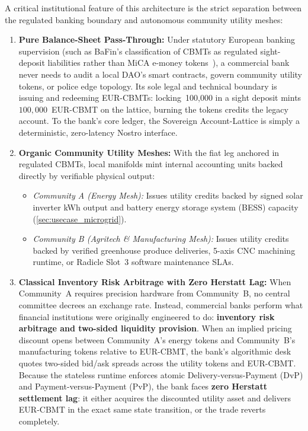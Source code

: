 \documentclass[a4paper,11pt,twoside,parskip=half-,headings=small]{scrartcl}
\newcommand{\EUR}[1]{\texteuro\,#1}
\begin{document}
A critical institutional feature of this architecture is the strict separation between the regulated banking boundary and autonomous community utility meshes:
\begin{enumerate}[nosep]
  \item \textbf{Pure Balance-Sheet Pass-Through:} Under statutory European banking supervision (such as BaFin's classification of CBMTs as regulated sight-deposit liabilities rather than MiCA e-money tokens~\cite{dk2023cbmt}), a commercial bank never needs to audit a local DAO's smart contracts, govern community utility tokens, or police edge topology. Its sole legal and technical boundary is issuing and redeeming EUR-CBMTs: locking \EUR{100,000} in a sight deposit mints $100{,}000$~EUR-CBMT on the lattice, burning the tokens credits the legacy account. To the bank's core ledger, the Sovereign Account-Lattice is simply a deterministic, zero-latency Nostro interface.
  \item \textbf{Organic Community Utility Meshes:} With the fiat leg anchored in regulated CBMTs, local manifolds mint internal accounting units backed directly by verifiable physical output:
  \begin{itemize}[nosep]
    \item \emph{Community A (Energy Mesh):} Issues utility credits backed by signed solar inverter kWh output and battery energy storage system (BESS) capacity (\cref{sec:usecase_microgrid}).
    \item \emph{Community B (Agritech \& Manufacturing Mesh):} Issues utility credits backed by verified greenhouse produce deliveries, 5-axis CNC machining runtime, or Radicle Slot~3 software maintenance SLAs.
  \end{itemize}
  \item \textbf{Classical Inventory Risk Arbitrage with Zero Herstatt Lag:} When Community~A requires precision hardware from Community~B, no central committee decrees an exchange rate. Instead, commercial banks perform what financial institutions were originally engineered to do: \textbf{inventory risk arbitrage and two-sided liquidity provision}. When an implied pricing discount opens between Community~A's energy tokens and Community~B's manufacturing tokens relative to EUR-CBMT, the bank's algorithmic desk quotes two-sided bid/ask spreads across the utility tokens and EUR-CBMT. Because the stateless runtime enforces atomic Delivery-versus-Payment (DvP) and Payment-versus-Payment (PvP), the bank faces \textbf{zero Herstatt settlement lag}: it either acquires the discounted utility asset and delivers EUR-CBMT in the exact same state transition, or the trade reverts completely.
\end{enumerate}
\end{document}
